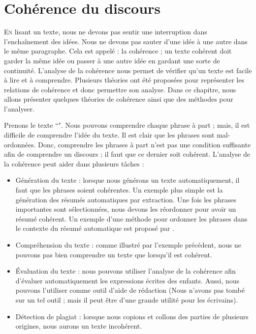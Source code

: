 \documentclass{KodeBook}
\begin{document}
		\mainmatter
	
\fi
\chapter{Cohérence du discours}

\begin{introduction}
	\lettrine{E}{n} lisant un texte, nous ne devons pas sentir une interruption dans l'enchaînement des idées.
	Nous ne devons pas sauter d'une idée à une autre dans le même paragraphe.
	Cela est appelé : la cohérence ; un texte cohérent doit garder la même idée ou passer à une autre idée en gardant une sorte de continuité.
	L'analyse de la cohérence nous permet de vérifier qu'un texte est facile à lire et à comprendre. 
	Plusieurs théories ont été proposées pour représenter les relations de cohérence et donc permettre son analyse.
	Dans ce chapitre, nous allons présenter quelques théories de cohérence ainsi que des méthodes pour l'analyser.
\end{introduction} 

Prenons le texte ``".
Nous pouvons comprendre chaque phrase à part ; mais, il est difficile de comprendre l'idée du texte. 
Il est clair que les phrases sont mal-ordonnées. 
Donc, comprendre les phrases à part n'est pas une condition suffisante afin de comprendre un discours ; il faut que ce dernier soit cohérent.
L'analyse de la cohérence peut aider dans plusieurs tâches :
\begin{itemize}
	\item Génération du texte : lorsque nous générons un texte automatiquement, il faut que les phrases soient cohérentes. 
	Un exemple plus simple est la génération des résumés automatiques par extraction. 
	Une fois les phrases importantes sont sélectionnées, nous devons les réordonner pour avoir un résumé cohérent. 
	Un exemple d'une méthode pour ordonner les phrases dans le contexte du résumé automatique est proposé par \citet{2019-oufaida-al}.
	\item Compréhension du texte : comme illustré par l'exemple précédent, nous ne pouvons pas bien comprendre un texte que lorsqu'il est cohérent.
	\item Évaluation du texte : nous pouvons utiliser l'analyse de la cohérence afin d'évaluer automatiquement les expressions écrites des enfants. 
	Aussi, nous pouvons l'utiliser comme outil d'aide de rédaction (Nous n'avons pas tombé sur un tel outil ; mais il peut être d'une grande utilité pour les écrivains).
	\item Détection de plagiat : lorsque nous copions et collons des parties de plusieurs origines, nous aurons un texte incohérent. 
\end{itemize}
\end{document}
